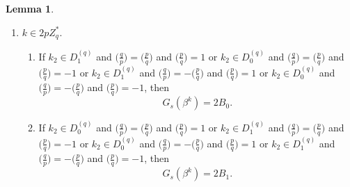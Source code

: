 \documentclass{mcom-l}
\theoremstyle{definition}
\newtheorem{sec3lemma10}[sec3lemma1]{Lemma}
\numberwithin{equation}{section}
\begin{document}
\begin{sec3lemma10}
\begin{enumerate}
\begin{enumerate}
    \begin{equation*}
    G_{s}(\beta^{k})=A_{0}-A_{1}-4.
    \end{equation*}
    \item
    If  $ k_{1}\in D_{0}^{(p)} $ and $ \biggl(\frac{q}{p}\biggr)=\biggl(\frac{p}{q}\biggr) $ and $ \biggl(\frac{q}{p}\biggr)=1 $ or $ k_{1}\in D_{1}^{(p)} $ and $ \biggl(\frac{q}{p}\biggr)=\biggl(\frac{p}{q}\biggr) $ and $ \biggl(\frac{q}{p}\biggr)=-1 $ or  $ k_{1}\in D_{0}^{(p)} $ and $ \biggl(\frac{q}{p}\biggr)=-\biggl(\frac{p}{q}\biggr) $ and $ \biggl(\frac{q}{p}\biggr)=1 $ or $ k_{1}\in D_{1}^{(p)} $ and $ \biggl(\frac{q}{p}\biggr)=-\biggl(\frac{p}{q}\biggr) $ and $ \biggl(\frac{q}{p}\biggr)=-1 $, then
    \begin{equation*}
    G_{s}(\beta^{k})=A_{1}-A_{0}-4.
    \end{equation*}
    \end{enumerate}
     \item $ k\in 2pZ^{*}_{q} $.
       \begin{enumerate}
       \item
       If  $ k_{2}\in D_{1}^{(q)} $ and $ \biggl(\frac{q}{p}\biggr)=\biggl(\frac{p}{q}\biggr) $ and $ \biggl(\frac{p}{q}\biggr)=1 $ or  $ k_{2}\in D_{0}^{(q)} $ and $ \biggl(\frac{q}{p}\biggr)=\biggl(\frac{p}{q}\biggr) $ and $ \biggl(\frac{p}{q}\biggr)=-1 $ or  $ k_{2}\in D_{1}^{(q)} $ and $ \biggl(\frac{q}{p}\biggr)=-\biggl(\frac{p}{q}\biggr) $ and $ \biggl(\frac{p}{q}\biggr)=1 $ or  $ k_{2}\in D_{0}^{(q)} $ and $ \biggl(\frac{q}{p}\biggr)=-\biggl(\frac{p}{q}\biggr) $ and $ \biggl(\frac{p}{q}\biggr)=-1 $, then
       \begin{equation*}
       G_{s}(\beta^{k})=2B_{0}.
       \end{equation*}
       \item
       If  $ k_{2}\in D_{0}^{(q)} $ and $ \biggl(\frac{q}{p}\biggr)=\biggl(\frac{p}{q}\biggr) $ and $ \biggl(\frac{p}{q}\biggr)=1 $ or  $ k_{2}\in D_{1}^{(q)} $ and $ \biggl(\frac{q}{p}\biggr)=\biggl(\frac{p}{q}\biggr) $ and $ \biggl(\frac{p}{q}\biggr)=-1 $ or  $ k_{2}\in D_{0}^{(q)} $ and $ \biggl(\frac{q}{p}\biggr)=-\biggl(\frac{p}{q}\biggr) $ and $ \biggl(\frac{p}{q}\biggr)=1 $ or  $ k_{2}\in D_{1}^{(q)} $ and $ \biggl(\frac{q}{p}\biggr)=-\biggl(\frac{p}{q}\biggr) $ and $ \biggl(\frac{p}{q}\biggr)=-1 $, then
       \begin{equation*}
       G_{s}(\beta^{k})=2B_{1}.
       \end{equation*}
       \end{enumerate}
    \end{enumerate}
    \end{sec3lemma10}
\end{document}
